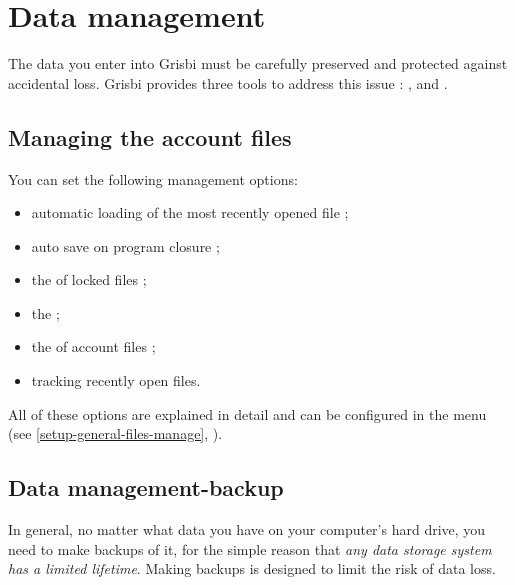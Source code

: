 
\chapter{Data management\label{datamanagement}}

The data you enter into Grisbi must be carefully preserved and protected against accidental loss. Grisbi provides three tools to address this issue : ,  and .

\section{Managing the account files\label{datamanagement-files}}

You can set the following management options:

\begin{itemize}
	\item automatic loading of the most recently opened file ;
	\item auto save on program closure ;
	\item the  of locked files ;
	\item the  ;
	\item the  of account files ;
	\item tracking recently open files.
\end{itemize}

All of these options are explained in detail and can be configured in the  menu (see \vref{setup-general-files-manage}, ).


\section{Data management-backup\label{datamanagement-backup}}

In general, no matter what data you have on your computer's hard drive, you need to make backups of it, for the simple reason that \emph{any data storage system has a limited lifetime}. Making backups is designed to limit the risk of data loss. 

